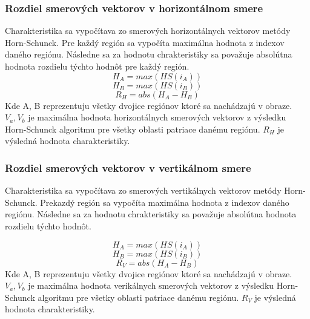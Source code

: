 \subsubsection{Rozdiel smerových vektorov v horizontálnom smere}
Charakteristika sa vypočítava zo smerových horizontálnych vektorov metódy Horn-Schunck.
Pre každý región sa vypočíta maximálna hodnota z indexov daného regiónu.
Následne sa za hodnotu chrakteristiky sa považuje absolútna hodnota rozdielu týchto hodnôt pre každý región.
\begin{equation}
  H_A = max(HS(i_A))
\end{equation}
\begin{equation}
  H_B = max(HS(i_B))
\end{equation}
\begin{equation}
  R_{H} = abs(H_A-H_B)
\end{equation}
Kde A, B reprezentuju všetky dvojice regiónov ktoré sa nachádzajú v obraze.
\begin{math}V_a, V_b\end{math} je maximálna hodnota horizontálnych smerových vektorov z výsledku Horn-Schunck algoritmu pre všetky oblasti patriace danému regiónu.
\begin{math}R_{H}\end{math} je výsledná hodnota charakteristiky.

\subsubsection{Rozdiel smerových vektorov v vertikálnom smere}
Charakteristika sa vypočítava zo smerových vertikálnych vektorov metódy Horn-Schunck.
Prekazdý región sa vypočíta maximálna hodnota z indexov daného regiónu.
Následne sa za hodnotu chrakteristiky sa považuje absolútna hodnota rozdielu týchto hodnôt.

\begin{equation}
  H_A = max(HS(i_A))
\end{equation}
\begin{equation}
  H_B = max(HS(i_B))
\end{equation}
\begin{equation}
  R_{V} = abs(H_A-H_B)
\end{equation}
Kde A, B reprezentuju všetky dvojice regiónov ktoré sa nachádzajú v obraze.
\begin{math}V_a, V_b\end{math} je maximálna hodnota verikálnych smerových vektorov z výsledku Horn-Schunck algoritmu pre všetky oblasti patriace danému regiónu.
\begin{math}R_{V}\end{math} je výsledná hodnota charakteristiky.


